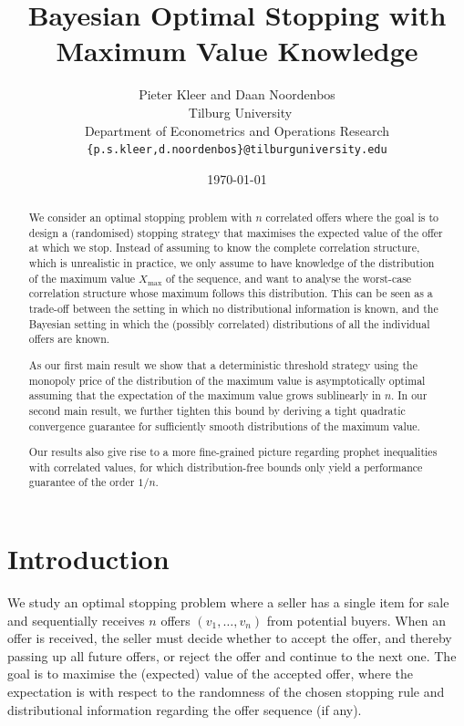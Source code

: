 \documentclass[11pt,a4paper]{article}
\title{Bayesian Optimal Stopping with Maximum Value Knowledge}
\author{Pieter Kleer and Daan Noordenbos\\\
Tilburg University\\
Department of Econometrics and Operations Research\\
\texttt{\{p.s.kleer,d.noordenbos\}@tilburguniversity.edu}}
\date{\today}
\numberwithin{equation}{section}
\begin{document}
\maketitle
\thispagestyle{empty}
\begin{abstract}
\noindent We consider an optimal stopping problem with $n$ correlated offers where the goal is to design a (randomised) stopping strategy that maximises the expected value of the offer at which we stop. Instead of assuming to know the complete correlation structure, which is unrealistic in practice, we only assume to have knowledge of the distribution of the maximum value $X_{\max}$ of the sequence, and want to analyse the worst-case correlation structure whose maximum follows this distribution. This can be seen as a trade-off between the setting in which no distributional information is known, and the Bayesian setting in which the (possibly correlated) distributions of all the individual offers are known.

As our first main result we show that a deterministic threshold strategy using the monopoly price of the distribution of the maximum value is asymptotically optimal assuming that the expectation of the maximum value grows sublinearly in $n$. In our second main result, we further tighten this bound by deriving a tight quadratic convergence guarantee for sufficiently smooth distributions of the maximum value.

Our results also give rise to a more fine-grained picture regarding prophet inequalities with correlated values, for which distribution-free bounds only yield a performance guarantee of the order $1/n$.
\end{abstract}

\newpage
{}
\setcounter{page}{1}   

\section{Introduction}
We study an optimal stopping problem where a seller has a single item for sale and sequentially receives $n$ offers $(v_1,\dots,v_n)$ from potential buyers.
When an offer is received, the seller must decide whether to accept the offer, and thereby passing up all future offers, or reject the offer and continue to the next one.
The goal is to maximise the (expected) value of the accepted offer, where the expectation is with respect to the randomness of the chosen stopping rule and distributional information regarding the offer sequence (if any).
\end{document}
